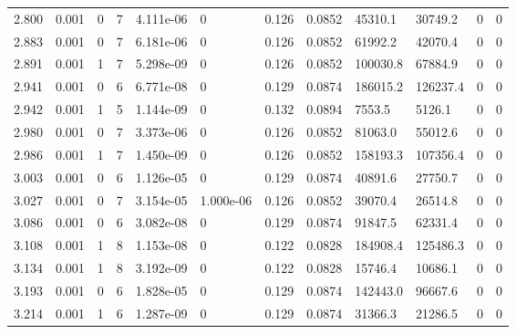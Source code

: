 \documentclass[preview]{standalone}
\begin{document}
{{{\begin{tabular}{L{1.2cm}C{1.2cm} C{0.3cm}C{0.5cm} C{1.4cm}C{1.4cm} C{1.4cm}C{1.4cm} C{1.6cm}C{1.6cm} C{1.6cm}C{1.6cm}}
  2.800  &  0.001  & 0     &  7 &  4.111e-06  & 0  &  0.126&   0.0852& 45310.1 & 30749.2   &  0 & 0  \\ 
  2.883  &  0.001  & 0     &  7 &  6.181e-06  & 0  &  0.126&   0.0852& 61992.2 & 42070.4   &  0 & 0  \\ 
  2.891  &  0.001  & 1     &  7 &  5.298e-09  & 0  &  0.126&   0.0852& 100030.8 & 67884.9   &  0 & 0  \\ 
  2.941  &  0.001  & 0     &  6 &  6.771e-08  & 0  &  0.129&   0.0874& 186015.2 & 126237.4   &  0 & 0  \\ 
  2.942  &  0.001  & 1     &  5 &  1.144e-09  & 0  &  0.132&   0.0894& 7553.5 & 5126.1   &  0 & 0  \\ 
  2.980  &  0.001  & 0     &  7 &  3.373e-06  & 0  &  0.126&   0.0852& 81063.0 & 55012.6   &  0 & 0  \\ 
  2.986  &  0.001  & 1     &  7 &  1.450e-09  & 0  &  0.126&   0.0852& 158193.3 & 107356.4   &  0 & 0  \\ 
  3.003  &  0.001  & 0     &  6 &  1.126e-05  & 0  &  0.129&   0.0874& 40891.6 & 27750.7   &  0 & 0  \\ 
  3.027  &  0.001  & 0     &  7 &  3.154e-05  & 1.000e-06  &  0.126&   0.0852& 39070.4 & 26514.8   &  0 & 0  \\ 
  3.086  &  0.001  & 0     &  6 &  3.082e-08  & 0  &  0.129&   0.0874& 91847.5 & 62331.4   &  0 & 0  \\ 
  3.108  &  0.001  & 1     &  8 &  1.153e-08  & 0  &  0.122&   0.0828& 184908.4 & 125486.3   &  0 & 0  \\ 
  3.134  &  0.001  & 1     &  8 &  3.192e-09  & 0  &  0.122&   0.0828& 15746.4 & 10686.1   &  0 & 0  \\ 
  3.193  &  0.001  & 0     &  6 &  1.828e-05  & 0  &  0.129&   0.0874& 142443.0 & 96667.6   &  0 & 0  \\ 
  3.214  &  0.001  & 1     &  6 &  1.287e-09  & 0  &  0.129&   0.0874& 31366.3 & 21286.5   &  0 & 0  \\ 
\hline 
\end{tabular} 

}}}
\end{document}
